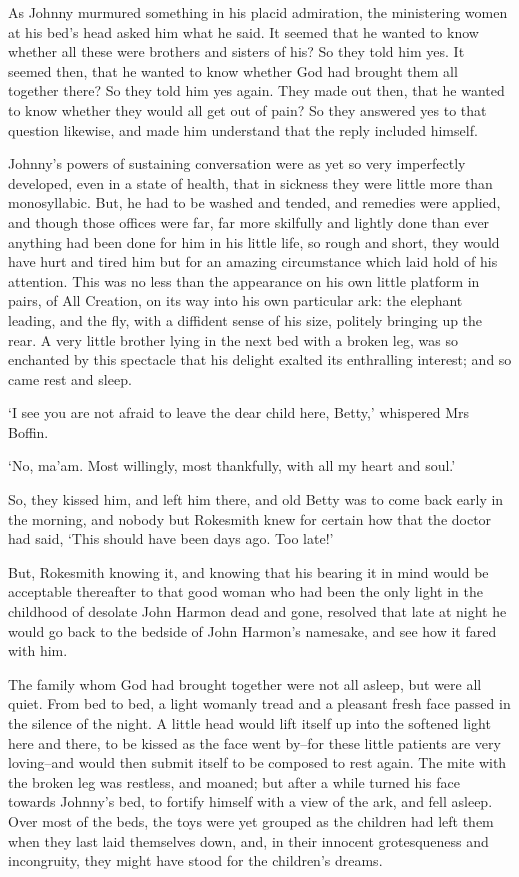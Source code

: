 As Johnny murmured something in his placid admiration, the ministering
women at his bed’s head asked him what he said. It seemed that he wanted
to know whether all these were brothers and sisters of his? So they told
him yes. It seemed then, that he wanted to know whether God had brought
them all together there? So they told him yes again. They made out then,
that he wanted to know whether they would all get out of pain? So they
answered yes to that question likewise, and made him understand that the
reply included himself.

Johnny’s powers of sustaining conversation were as yet so very
imperfectly developed, even in a state of health, that in sickness they
were little more than monosyllabic. But, he had to be washed and tended,
and remedies were applied, and though those offices were far, far more
skilfully and lightly done than ever anything had been done for him in
his little life, so rough and short, they would have hurt and tired him
but for an amazing circumstance which laid hold of his attention. This
was no less than the appearance on his own little platform in pairs,
of All Creation, on its way into his own particular ark: the elephant
leading, and the fly, with a diffident sense of his size, politely
bringing up the rear. A very little brother lying in the next bed with a
broken leg, was so enchanted by this spectacle that his delight exalted
its enthralling interest; and so came rest and sleep.

‘I see you are not afraid to leave the dear child here, Betty,’
whispered Mrs Boffin.

‘No, ma’am. Most willingly, most thankfully, with all my heart and
soul.’

So, they kissed him, and left him there, and old Betty was to come back
early in the morning, and nobody but Rokesmith knew for certain how that
the doctor had said, ‘This should have been days ago. Too late!’

But, Rokesmith knowing it, and knowing that his bearing it in mind would
be acceptable thereafter to that good woman who had been the only light
in the childhood of desolate John Harmon dead and gone, resolved that
late at night he would go back to the bedside of John Harmon’s namesake,
and see how it fared with him.

The family whom God had brought together were not all asleep, but were
all quiet. From bed to bed, a light womanly tread and a pleasant fresh
face passed in the silence of the night. A little head would lift itself
up into the softened light here and there, to be kissed as the face went
by--for these little patients are very loving--and would then submit
itself to be composed to rest again. The mite with the broken leg was
restless, and moaned; but after a while turned his face towards Johnny’s
bed, to fortify himself with a view of the ark, and fell asleep. Over
most of the beds, the toys were yet grouped as the children had left
them when they last laid themselves down, and, in their innocent
grotesqueness and incongruity, they might have stood for the children’s
dreams.

